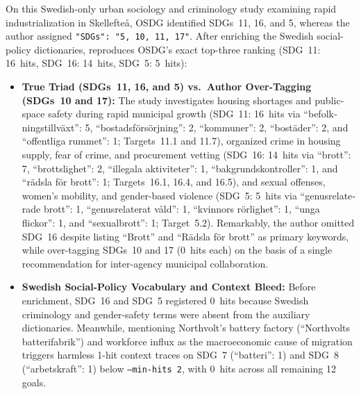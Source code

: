 \begin{casestudySection}
On this Swedish-only urban sociology and criminology study examining rapid industrialization in Skellefteå, OSDG identified \glspl{SDG}~11, 16, and 5, whereas the author assigned \texttt{"SDGs": "5, 10, 11, 17"}. After enriching the Swedish social-policy dictionaries,  reproduces OSDG's exact top-three ranking (\gls{SDG}~11: \num{16}~hits, \gls{SDG}~16: \num{14}~hits, \gls{SDG}~5: \num{5}~hits):
\begin{itemize}
    \item \textbf{True Triad (\glspl{SDG}~11, 16, and 5) vs.\ Author Over-Tagging (\glspl{SDG}~10 and 17):} The study investigates housing shortages and public-space safety during rapid municipal growth (\gls{SDG}~11: \num{16}~hits via \enquote{\foreignlanguage{swedish}{befolkningstillväxt}}: 5, \enquote{\foreignlanguage{swedish}{bostadsförsörjning}}: 2, \enquote{\foreignlanguage{swedish}{kommuner}}: 2, \enquote{\foreignlanguage{swedish}{bostäder}}: 2, and \enquote{\foreignlanguage{swedish}{offentliga rummet}}: 1; Targets~11.1 and 11.7), organized crime in housing supply, fear of crime, and procurement vetting (\gls{SDG}~16: \num{14}~hits via \enquote{\foreignlanguage{swedish}{brott}}: 7, \enquote{\foreignlanguage{swedish}{brottslighet}}: 2, \enquote{\foreignlanguage{swedish}{illegala aktiviteter}}: 1, \enquote{\foreignlanguage{swedish}{bakgrundskontroller}}: 1, and \enquote{\foreignlanguage{swedish}{rädsla för brott}}: 1; Targets~16.1, 16.4, and 16.5), and sexual offenses, women's mobility, and gender-based violence (\gls{SDG}~5: \num{5}~hits via \enquote{\foreignlanguage{swedish}{genusrelaterade brott}}: 1, \enquote{\foreignlanguage{swedish}{genusrelaterat våld}}: 1, \enquote{\foreignlanguage{swedish}{kvinnors rörlighet}}: 1, \enquote{\foreignlanguage{swedish}{unga flickor}}: 1, and \enquote{\foreignlanguage{swedish}{sexualbrott}}: 1; Target~5.2). Remarkably, the author omitted \gls{SDG}~16 despite listing \enquote{\foreignlanguage{swedish}{Brott}} and \enquote{\foreignlanguage{swedish}{Rädsla för brott}} as primary keywords, while over-tagging \glspl{SDG}~10 and 17 (\num{0}~hits each) on the basis of a single recommendation for inter-agency municipal collaboration.
    
    \item \textbf{Swedish Social-Policy Vocabulary and Context Bleed:} Before enrichment, \gls{SDG}~16 and \gls{SDG}~5 registered \num{0}~hits because Swedish criminology and gender-safety terms were absent from the auxiliary dictionaries. Meanwhile, mentioning Northvolt's battery factory (\enquote{\foreignlanguage{swedish}{Northvolts batterifabrik}}) and workforce influx as the macroeconomic cause of migration triggers harmless \num{1}-hit context traces on \gls{SDG}~7 (\enquote{\foreignlanguage{swedish}{batteri}}: 1) and \gls{SDG}~8 (\enquote{\foreignlanguage{swedish}{arbetskraft}}: 1) below \texttt{--min-hits 2}, with \num{0}~hits across all remaining \num{12} goals.
    

\end{itemize}
\end{casestudySection}
